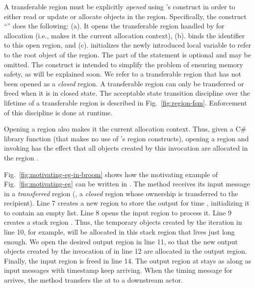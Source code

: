  A transferable region must be
explicitly \emph{opened} using \name's  construct in order to
either read or update or allocate objects in the region.
Specifically, the construct ``'' does the
following: (a). It opens the transferable region handled by 
for allocation (i.e., makes it the current allocation context), (b).
binds the identifier  to this open region, and (c). initializes
the newly introduced local variable  to refer to the root object
of the region.  The  part of the statement is optional and may
be omitted.  The  construct is intended to simplify the
problem of ensuring memory safety, as will be explained soon.  We
refer to a transferable region that has not been opened as a
\emph{closed} region. A transferable region can only be transferred or
freed when it is in closed state. The acceptable state transition
discipline over the lifetime of a transferable region is described
in Fig.~\ref{fig:region-fsm}. Enforcement of this discipline is done
at runtime.

Opening a region also makes it the current allocation context.
Thus, given a  C\# library function  (that makes no use of \name's region constructs),
opening a region  and invoking  has the effect that all objects created by this
invocation are allocated in the region .

Fig.~\ref{fig:motivating-eg-in-broom} shows how the motivating example
of Fig.~\ref{fig:motivating-eg} can be written in \name.  The
 method receives its input message in a
\emph{transferred} region (\ie, a \emph{closed} region whose ownership
is transferred to the recipient).  Line 7 creates a new region to
store the output for time , initializing it to contain an empty
list.  Line 8 opens the input region to process it.
Line 9 creates a stack region .  Thus, the temporary objects created by
the iteration in line 10, for example, will be allocated in this stack
region that lives just long enough.  We open the desired output region
in line 11, so that the new output objects created by the invocation
of  in line 12 are allocated in the output region.
Finally, the input region is freed in line 14. The output region at
 stays as along as input messages with timestamp  keep
arriving. When the timing message for  arrives, the 
method transfers the  at  to a downstream actor.

